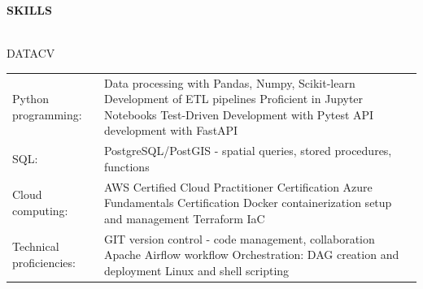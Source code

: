 \documentclass[letterpaper]{article}
\newcommand{\lineunder} {
        \vspace*{-8pt} \\
        \hspace*{-18pt} \hrulefill \\
    }
\newcommand{\header} [1] {
        \vspace{9pt}
        {\hspace*{-18pt}\vspace*{6pt} \large \textbf {#1}}
        \vspace*{-6pt} \lineunder
        \vspace{2pt}
    }
\newenvironment{skillslist}
        {
            \hspace*{-0.07in}\begin{tabular}[t]{ l L{5.17in} }
        }{
            \end{tabular}
        }
\begin{document}
\header{SKILLS}
    \begin{taggedblock}{DATACV}
        \begin{skillslist}
            Python programming:&
                Data processing with Pandas, Numpy, Scikit-learn \linebreak
                Development of ETL pipelines \linebreak
                Proficient in Jupyter Notebooks \linebreak
                Test-Driven Development with Pytest \linebreak
                API development with FastAPI \linebreak
                \\
            SQL:&
                PostgreSQL/PostGIS - spatial queries, stored procedures, functions \linebreak
                \\
            Cloud computing:&
                AWS Certified Cloud Practitioner Certification \linebreak
                Azure Fundamentals Certification \linebreak
                Docker containerization setup and management \linebreak
                Terraform IaC \linebreak
                \\
            Technical proficiencies:&
                GIT version control - code management, collaboration \linebreak
                Apache Airflow workflow Orchestration: DAG creation and deployment \linebreak
                Linux and shell scripting \linebreak
                \\
        \end{skillslist}
    \end{taggedblock}
\end{document}
